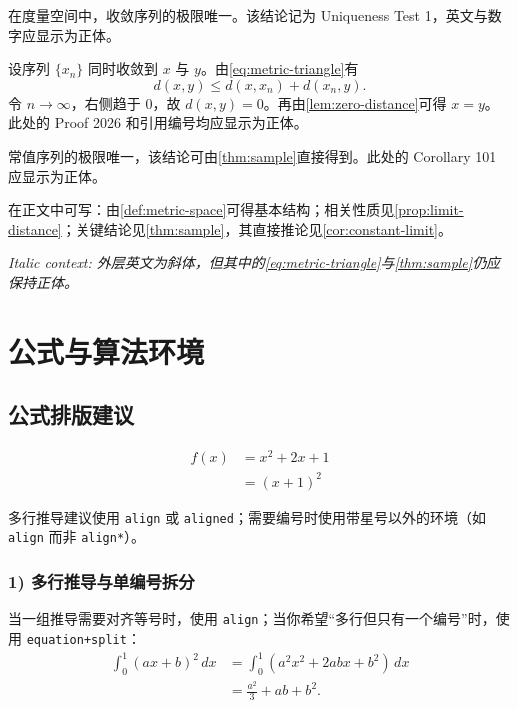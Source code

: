 \begin{theorem}\label{thm:sample}
在度量空间中，收敛序列的极限唯一。该结论记为 Uniqueness Test 1，英文与数字应显示为正体。
\end{theorem}

\begin{proofenv}
设序列 $\{x_n\}$ 同时收敛到 $x$ 与 $y$。由\cref{eq:metric-triangle}有
\[
  d(x,y)\le d(x,x_n)+d(x_n,y).
\]
令 $n\to\infty$，右侧趋于 $0$，故 $d(x,y)=0$。再由\cref{lem:zero-distance}可得 $x=y$。此处的 Proof 2026 和引用编号均应显示为正体。
\end{proofenv}

\begin{corollary}\label{cor:constant-limit}
常值序列的极限唯一，该结论可由\cref{thm:sample}直接得到。此处的 Corollary 101 应显示为正体。
\end{corollary}

在正文中可写：由\cref{def:metric-space}可得基本结构；相关性质见\cref{prop:limit-distance}；关键结论见\cref{thm:sample}，其直接推论见\cref{cor:constant-limit}。

\textit{Italic context: 外层英文为斜体，但其中的\cref{eq:metric-triangle}与\cref{thm:sample}仍应保持正体。}

\section{公式与算法环境}

\subsection{公式排版建议}

\begin{align}
  f(x) &= x^2 + 2x + 1 \\
       &= (x+1)^2
\end{align}

多行推导建议使用 \verb|align| 或 \verb|aligned|；需要编号时使用带星号以外的环境（如 \verb|align| 而非 \verb|align*|）。

\subsubsection*{1) 多行推导与单编号拆分}
当一组推导需要对齐等号时，使用 \verb|align|；当你希望“多行但只有一个编号”时，使用 \verb|equation+split|：
\begin{equation}\label{eq:usage-split}
  \begin{split}
    \int_0^1 (ax+b)^2\,dx
      &= \int_0^1 (a^2x^2+2abx+b^2)\,dx \\
      &= \frac{a^2}{3}+ab+b^2 .
  \end{split}
\end{equation}

